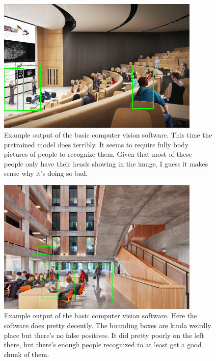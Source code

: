 \documentclass[a4paper,12pt]{gress}
\begin{document}
\begin{figure}[H]
  \begin{center}
  \includegraphics[width=100mm, scale=0.2]{pictures/myhal2.png}
  \caption{Example output of the basic computer vision software. This time the pretrained model does terribly. It seems to require fully body pictures of people to recognize them. Given that most of these people only have their heads showing in the image, I guess it makes sense why it's doing so bad.}
  \end{center}
\end{figure}

\begin{figure}[H]
  \begin{center}
  \includegraphics[width=100mm, scale=0.2]{pictures/myhal3.png}
  \caption{Example output of the basic computer vision software. Here the software does pretty decently. The bounding boxes are kinda weirdly place but there's no false positives. It did pretty poorly on the left there, but there's enough people recognized to at least get a good chunk of them.}
  \end{center}
\end{figure}
\end{document}
